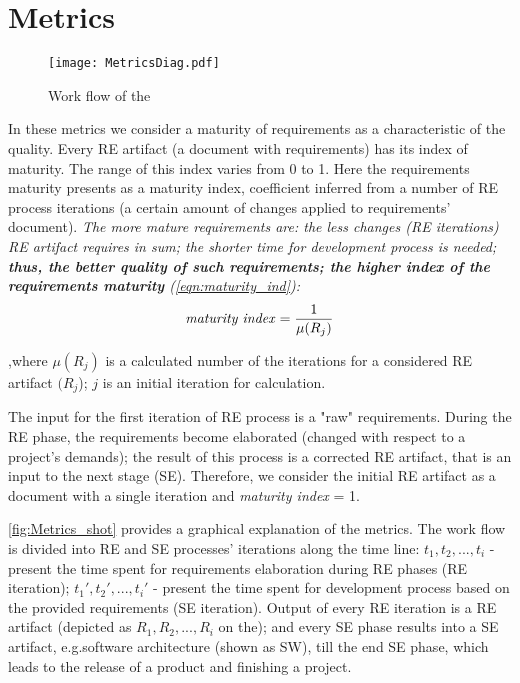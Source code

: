 \section{Metrics}
\label{sec:Solution} 

\begin{figure*}[!th]
	\centering
		\texttt{[image: MetricsDiag.pdf]}
	\caption{Work flow of the }
	\label{fig:Metrics_shot}
\end{figure*}

In these metrics we consider a maturity of requirements as a characteristic of the quality.
Every RE artifact (a document with requirements) has its index of maturity. The range of this index varies from 0 to 1.
Here the requirements maturity presents as a maturity index, coefficient inferred from a number of RE process iterations (a certain amount of changes applied to requirements' document).
\textit{The more mature requirements are: the less changes (RE iterations) RE artifact requires in sum; the shorter time for development process is needed; \textbf{thus, the better quality of such requirements; the higher index of the requirements maturity }(\autoref{eqn:maturity_ind}):}
  \begin{equation}\label{eqn:maturity_ind}
\textrm{\textit{maturity index}} = \frac{1}{\mu(R_{j})}
	\end{equation}

,where $\mu(R_{j})$ is a calculated number of the iterations for a considered RE artifact $(R_{j}$); $j$ is an initial iteration for calculation.

The input for the first iteration of RE process is a "raw" requirements. During the RE phase, the requirements become elaborated (changed with respect to a project's demands); the result of this process is a corrected RE artifact, that is an input to the next stage (SE). Therefore, we consider the initial RE artifact as a document with a single iteration and \textit{maturity index} = 1.

\autoref{fig:Metrics_shot} provides a graphical explanation of the metrics. The work flow is divided into RE and SE processes' iterations along the time line: $t_{1},t_{2},...,t_{i}$ - present the time spent for requirements elaboration during RE phases (RE iteration); $t_{1}',t_{2}',...,t_{i}'$ - present the time spent for development process based on the provided requirements (SE iteration).
Output of every RE iteration is a RE artifact (depicted as $R_{1},R_{2},...,R_{i}$ on the); and every SE phase results into a SE artifact, e.g.software architecture (shown as SW), till the end SE phase, which leads to the release of a product and finishing a project.  

